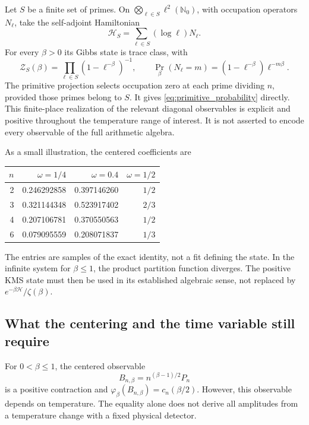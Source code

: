 Let $S$ be a finite set of primes. On
$\bigotimes_{\ell\in S}\ell^2(\mathbb N_0)$, with occupation operators
$N_\ell$, take the self-adjoint Hamiltonian
\begin{equation}
 \mathcal H_S=\sum_{\ell\in S}(\log\ell)N_\ell.
 \label{eq:finite_hamiltonian}
\end{equation}
For every $\beta>0$ its Gibbs state is trace class, with
\begin{equation}
 \mathcal Z_S(\beta)=\prod_{\ell\in S}(1-\ell^{-\beta})^{-1},
 \qquad
 \Pr_\beta(N_\ell=m)=(1-\ell^{-\beta})\ell^{-m\beta}.
 \label{eq:geometric_law}
\end{equation}
The primitive projection selects occupation zero at each prime dividing
$n$, provided those primes belong to $S$. It gives
\eqref{eq:primitive_probability} directly. This finite-place realization
of the relevant diagonal observables is explicit and positive throughout
the temperature range of interest. It is not asserted to encode every
observable of the full arithmetic algebra.

As a small illustration, the centered coefficients are
\begin{center}
\small
\begin{tabular}{@{}rrrr@{}}
\toprule
$n$ & $\omega=1/4$ & $\omega=0.4$ & $\omega=1/2$\\
\midrule
2 & 0.246292858 & 0.397146260 & $1/2$\\
3 & 0.321144348 & 0.523917402 & $2/3$\\
4 & 0.207106781 & 0.370550563 & $1/2$\\
6 & 0.079095559 & 0.208071837 & $1/3$\\
\bottomrule
\end{tabular}
\end{center}
The entries are samples of the exact identity, not a fit defining the
state. In the infinite system for $\beta\le1$, the product partition
function diverges. The positive KMS state must then be used in its
established algebraic sense, not replaced by
$e^{-\beta\mathcal H}/\zeta(\beta)$.

\subsection{What the centering and the time variable still require}

For $0<\beta\le1$, the centered observable
\begin{equation}
 B_{n,\beta}=n^{(\beta-1)/2}P_n
\end{equation}
is a positive contraction and
$\varphi_\beta(B_{n,\beta})=c_n(\beta/2)$. However, this observable
depends on temperature. The equality alone does not derive all
amplitudes from a temperature change with a fixed physical detector.

